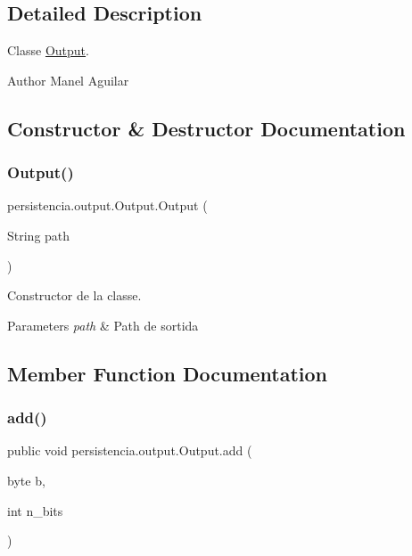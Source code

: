 \subsection{Detailed Description}
Classe \hyperlink{classpersistencia_1_1output_1_1Output}{Output}. 

\begin{DoxyAuthor}{Author}
Manel Aguilar 
\end{DoxyAuthor}


\subsection{Constructor \& Destructor Documentation}
\mbox{\label{classpersistencia_1_1output_1_1Output_acbb70ea9eabb2a6d0b2d7bd2f3c9009a}} 
\subsubsection{\texorpdfstring{Output()}{Output()}}
{\footnotesize\ttfamily persistencia.\+output.\+Output.\+Output (\begin{DoxyParamCaption}\item[{String}]{path }\end{DoxyParamCaption})\hspace{0.3cm}{\ttfamily [inline]}}



Constructor de la classe. 


\begin{DoxyParams}{Parameters}
{\em path} & Path de sortida \\
\hline
\end{DoxyParams}


\subsection{Member Function Documentation}
\mbox{\label{classpersistencia_1_1output_1_1Output_adc03a0dd7a94da21fe8432064a4eec09}} 
\subsubsection{\texorpdfstring{add()}{add()}}
{\footnotesize\ttfamily public void persistencia.\+output.\+Output.\+add (\begin{DoxyParamCaption}\item[{byte}]{b,  }\item[{int}]{n\+\_\+bits }\end{DoxyParamCaption})\hspace{0.3cm}{\ttfamily [inline]}}




